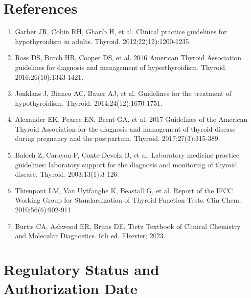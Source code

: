 \section*{References}
\begin{enumerate}
  \item Garber JR, Cobin RH, Gharib H, et al. Clinical practice guidelines for hypothyroidism in adults. Thyroid. 2012;22(12):1200-1235.
  \item Ross DS, Burch HB, Cooper DS, et al. 2016 American Thyroid Association guidelines for diagnosis and management of hyperthyroidism. Thyroid. 2016;26(10):1343-1421.
  \item Jonklaas J, Bianco AC, Bauer AJ, et al. Guidelines for the treatment of hypothyroidism. Thyroid. 2014;24(12):1670-1751.
  \item Alexander EK, Pearce EN, Brent GA, et al. 2017 Guidelines of the American Thyroid Association for the diagnosis and management of thyroid disease during pregnancy and the postpartum. Thyroid. 2017;27(3):315-389.
  \item Baloch Z, Carayon P, Conte-Devolx B, et al. Laboratory medicine practice guidelines: laboratory support for the diagnosis and monitoring of thyroid disease. Thyroid. 2003;13(1):3-126.
  \item Thienpont LM, Van Uytfanghe K, Beastall G, et al. Report of the IFCC Working Group for Standardization of Thyroid Function Tests. Clin Chem. 2010;56(6):902-911.
  \item Burtis CA, Ashwood ER, Bruns DE. Tietz Textbook of Clinical Chemistry and Molecular Diagnostics. 6th ed. Elsevier; 2023.
\end{enumerate}

\clearpage
\section*{Regulatory Status and Authorization Date}

\clearpage
